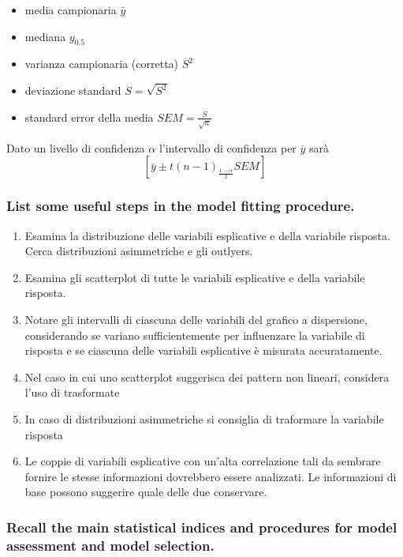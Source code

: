 \documentclass[
]{article}
\begin{document}
\begin{itemize}
\item
  media campionaria \(\bar{y}\)
\item
  mediana \(y_{0.5}\)
\item
  varianza campionaria (corretta) \(S^2\)
\item
  deviazione standard \(S = \sqrt{S^2}\)
\item
  standard error della media \(SEM = \frac{S}{\sqrt{n}}\)
\end{itemize}

Dato un livello di confidenza \(\alpha\) l'intervallo di confidenza per
\(\bar{y}\) sarà
\[ \left[ \bar{y} \pm t(n-1)_{\frac{1-\alpha}{2}}SEM \right] \]

\hypertarget{list-some-useful-steps-in-the-model-fitting-procedure.}{%
\subsubsection{List some useful steps in the model fitting
procedure.}\label{list-some-useful-steps-in-the-model-fitting-procedure.}}

\begin{enumerate}
\def\labelenumi{\arabic{enumi}.}
\item
  Esamina la distribuzione delle variabili esplicative e della variabile
  risposta. Cerca distribuzioni asimmetriche e gli outlyers.
\item
  Esamina gli scatterplot di tutte le variabili esplicative e della
  variabile risposta.
\item
  Notare gli intervalli di ciascuna delle variabili del grafico a
  dispersione, considerando se variano sufficientemente per influenzare
  la variabile di risposta e se ciascuna delle variabili esplicative è
  misurata accuratamente.
\item
  Nel caso in cui uno scatterplot suggerisca dei pattern non lineari,
  considera l'uso di trasformate
\item
  In caso di distribuzioni asimmetriche si consiglia di traformare la
  variabile risposta
\item
  Le coppie di variabili esplicative con un'alta correlazione tali da
  sembrare fornire le stesse informazioni dovrebbero essere analizzati.
  Le informazioni di base possono suggerire quale delle due conservare.
\end{enumerate}

\hypertarget{recall-the-main-statistical-indices-and-procedures-for-model-assessment-and-model-selection.}{%
\subsubsection{Recall the main statistical indices and procedures for
model assessment and model
selection.}\label{recall-the-main-statistical-indices-and-procedures-for-model-assessment-and-model-selection.}}
\end{document}
